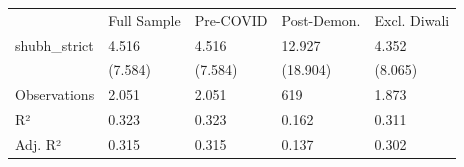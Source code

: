 \begin{tabular}{lllll}
& Full Sample & Pre-COVID & Post-Demon. & Excl. Diwali \\
shubh\_strict & \num{4.516} & \num{4.516} & \num{12.927} & \num{4.352} \\
& (\num{7.584}) & (\num{7.584}) & (\num{18.904}) & (\num{8.065}) \\
Observations & \num{2,051} & \num{2,051} & \num{619} & \num{1,873} \\
R² & \num{0.323} & \num{0.323} & \num{0.162} & \num{0.311} \\
Adj. R² & \num{0.315} & \num{0.315} & \num{0.137} & \num{0.302} \\
\end{tabular}
